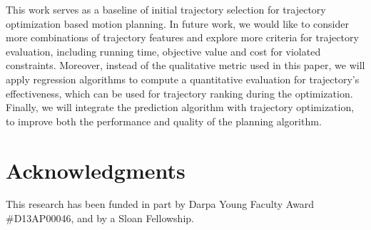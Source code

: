 \documentclass[letterpaper, 10 pt, conference]{ieeeconf}  %
\begin{document}
This work serves as a baseline of initial trajectory selection for trajectory optimization based motion planning. In future work, we would like to consider more combinations of trajectory features and explore more criteria for trajectory evaluation, including running time, objective value and cost for violated constraints. Moreover, instead of the qualitative metric used in this paper, we will apply regression algorithms to compute a quantitative evaluation for trajectory's effectiveness, which can be used for trajectory ranking during the optimization.
Finally, we will integrate the prediction algorithm with trajectory optimization, to improve both the performance and quality of the planning algorithm.


\section*{Acknowledgments}
This research has been funded in part by Darpa Young Faculty Award \#D13AP00046, and by a Sloan Fellowship.




\end{document}

